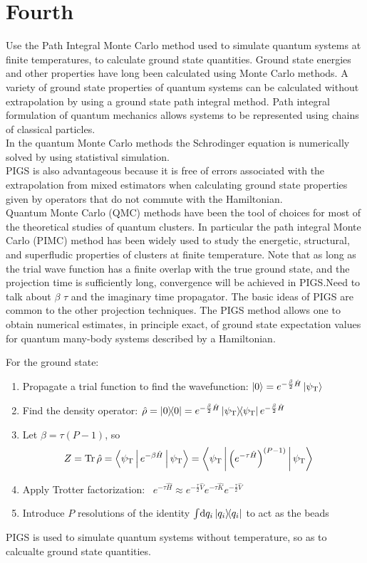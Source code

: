 \documentclass[12pt,letterpaper,oneside]{article}               %
\newcommand{\psiT}{\psi_{\textrm{T}}}
\DeclareMathOperator{\Tr}{Tr}
\begin{document}
\section{Fourth}
 Use the Path Integral Monte Carlo method used to simulate quantum systems at finite temperatures, to calculate ground state quantities. Ground state energies and other properties have long been calculated using Monte Carlo methods. A variety of ground state properties of quantum systems can be calculated without extrapolation by using a ground state path integral method. Path integral formulation of quantum mechanics allows systems to be represented using chains of classical particles. \\
In the quantum Monte Carlo methods the Schrodinger equation is numerically solved by using statistival simulation. \\
PIGS is also advantageous because it is free of errors associated with the extrapolation from mixed estimators when calculating ground state properties given by operators that do not commute with the Hamiltonian. \\
Quantum Monte Carlo (QMC) methods have been the tool of choices for most of the theoretical studies of quantum clusters. In particular the path integral Monte Carlo (PIMC) method has been widely used to study the energetic, structural, and superfludic properties of clusters at finite temperature. Note that as long as the trial wave function has a finite overlap with the true ground state, and the projection time is sufficiently long, convergence will be achieved in PIGS.Need to talk about $\beta$ $\tau$ and the imaginary time propagator.
The basic ideas of PIGS are common to the other projection techniques. The PIGS method allows one to obtain numerical estimates, in principle exact, of ground state expectation values for quantum many-body systems described by a Hamiltonian.


For the ground state:
\begin{enumerate}\setlength{\itemindent}{1em}
	\item Propagate a trial function to find the wavefunction: $\ket{0} = e^{-\frac{\beta}{2} \hat{H}} \ket{\psiT}$
	\item Find the density operator: $\hat{\rho} = \ket{0}\!\!\bra{0} = e^{-\frac{\beta}{2} \hat{H}} \ket{\psiT}\!\!\bra{\psiT} e^{-\frac{\beta}{2} \hat{H}}$
	\item Let $\beta = \tau (P-1)$, so
		\begin{align*}
			Z
			&= \Tr{\hat{\rho}}
			= \Braket{\psiT | e^{-\beta \hat{H}} | \psiT}
			= \Braket{\psiT | \left( e^{-\tau \hat{H}} \right)^{(P-1)} | \psiT}
		\end{align*}
	\item Apply Trotter factorization:~\cite{schmidt2014inclusion}
		$
			e^{-\tau \hat{H}}
			\approx
				e^{-\frac{\tau}{2}\hat{V}}
				e^{-\tau\hat{K}}
				e^{-\frac{\tau}{2}\hat{V}}
		$
	\item Introduce $P$ resolutions of the identity $\int\! \dif q_i \ket{q_i}\!\!\bra{q_i}$ to act as the beads
\end{enumerate}


PIGS is used to simulate quantum systems without temperature, so as to calcualte ground state quantities.
\end{document}
